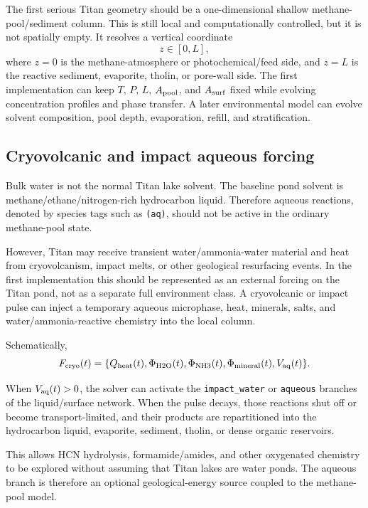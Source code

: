 \documentclass[11pt]{article}
\begin{document}
The first serious Titan geometry should be a one-dimensional shallow methane-pool/sediment column. This is still local and computationally controlled, but it is not spatially empty. It resolves a vertical coordinate
\begin{equation}
z\in[0,L],
\end{equation}
where $z=0$ is the methane-atmosphere or photochemical/feed side, and $z=L$ is the reactive sediment, evaporite, tholin, or pore-wall side. The first implementation can keep $T$, $P$, $L$, $A_{\rm pool}$, and $A_{\rm surf}$ fixed while evolving concentration profiles and phase transfer. A later environmental model can evolve solvent composition, pool depth, evaporation, refill, and stratification.

\subsection{Cryovolcanic and impact aqueous forcing}

Bulk water is not the normal Titan lake solvent. The baseline pond solvent is methane/ethane/nitrogen-rich hydrocarbon liquid. Therefore aqueous reactions, denoted by species tags such as \texttt{(aq)}, should not be active in the ordinary methane-pool state.

However, Titan may receive transient water/ammonia-water material and heat from cryovolcanism, impact melts, or other geological resurfacing events. In the first implementation this should be represented as an external forcing on the Titan pond, not as a separate full environment class. A cryovolcanic or impact pulse can inject a temporary aqueous microphase, heat, minerals, salts, and water/ammonia-reactive chemistry into the local column.

Schematically,
\begin{equation}
F_{\rm cryo}(t)
=
\{Q_{\rm heat}(t), \Phi_{\rm H2O}(t), \Phi_{\rm NH3}(t),
\Phi_{\rm mineral}(t), V_{\rm aq}(t)\}.
\end{equation}

When $V_{\rm aq}(t)>0$, the solver can activate the \texttt{impact\_water} or \texttt{aqueous} branches of the liquid/surface network. When the pulse decays, those reactions shut off or become transport-limited, and their products are repartitioned into the hydrocarbon liquid, evaporite, sediment, tholin, or dense organic reservoirs.

This allows HCN hydrolysis, formamide/amides, and other oxygenated chemistry to be explored without assuming that Titan lakes are water ponds. The aqueous branch is therefore an optional geological-energy source coupled to the methane-pool model.
\end{document}
